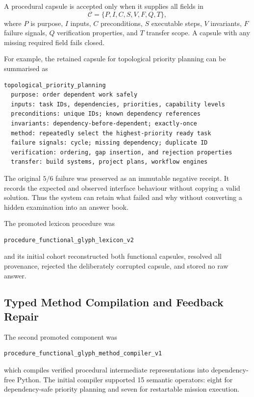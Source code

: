 A procedural capsule is accepted only when it supplies all fields in
\begin{equation}
\mathcal{C} =
\{P,I,C,S,V,F,Q,T\},
\end{equation}
where $P$ is purpose, $I$ inputs, $C$ preconditions, $S$ executable steps,
$V$ invariants, $F$ failure signals, $Q$ verification properties, and $T$
transfer scope.  A capsule with any missing required field fails closed.

For example, the retained capsule for topological priority planning can be
summarised as
\begin{verbatim}
topological_priority_planning
  purpose: order dependent work safely
  inputs: task IDs, dependencies, priorities, capability levels
  preconditions: unique IDs; known dependency references
  invariants: dependency-before-dependent; exactly-once
  method: repeatedly select the highest-priority ready task
  failure signals: cycle; missing dependency; duplicate ID
  verification: ordering, gap insertion, and rejection properties
  transfer: build systems, project plans, workflow engines
\end{verbatim}

The original $5/6$ failure was preserved as an immutable negative receipt.  It
records the expected and observed interface behaviour without copying a valid
solution.  Thus the system can retain what failed and why without converting a
hidden examination into an answer book.

The promoted lexicon procedure was
\begin{verbatim}
procedure_functional_glyph_lexicon_v2
\end{verbatim}
and its initial cohort reconstructed both functional capsules, resolved all
provenance, rejected the deliberately corrupted capsule, and stored no raw
answer.

\subsection{Typed Method Compilation and Feedback Repair}

The second promoted component was
\begin{verbatim}
procedure_functional_glyph_method_compiler_v1
\end{verbatim}
which compiles verified procedural intermediate representations into
dependency-free Python.  The initial compiler supported 15 semantic operators:
eight for dependency-safe priority planning and seven for restartable mission
execution.

